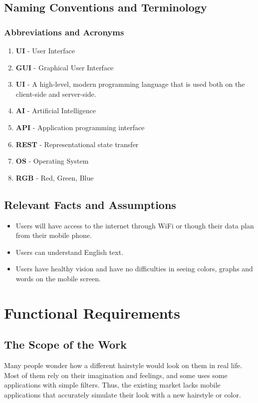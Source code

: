 \documentclass[12pt]{article}
\begin{document}
\subsection{Naming Conventions and Terminology}
\subsubsection{Abbreviations and Acronyms}
\begin{enumerate}
\item \textbf{UI} - User Interface
\item \textbf{GUI} - Graphical User Interface
\item \textbf{UI} - A high-level, modern programming language that is used both on the client-side and server-side.
\item \textbf{AI} - Artificial Intelligence
\item \textbf{API} - Application programming interface
\item \textbf{REST} - Representational state transfer
\item \textbf{OS} - Operating System
\item \textbf{RGB} - Red, Green, Blue

\end{enumerate}

  
\subsection{Relevant Facts and Assumptions}
\begin{itemize}
    \item Users will have access to the internet through WiFi or though their data plan from their mobile phone.
    \item Users can understand English text.
    \item Users have healthy vision and have no difficulties in seeing colors, graphs and words on the mobile screen.
\end{itemize}

\section{Functional Requirements}
\subsection{The Scope of the Work}
Many people wonder how a different hairstyle would look on them in real life. Most of them rely on their imagination and feelings, and some uses some applications with simple filters. Thus, the existing market lacks mobile applications that accurately simulate their look with a new hairstyle or color.
\end{document}
